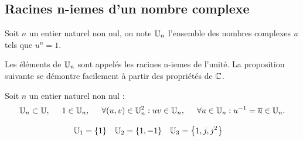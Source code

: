 \subsection{Racines n-iemes d'un nombre complexe}

\begin{defi}
 Soit $n$ un entier naturel non nul, on note $\mathbb{U}_n$ l'ensemble des nombres complexes $u$ tels que $u^n=1$.
\end{defi}
Les éléments de $\mathbb{U}_n$ sont appelés les racines n-iemes de l'unité. La proposition suivante se démontre facilement à partir des propriétés de $\mathbb{C}$.
\begin{prop} Soit $n$ un entier naturel non nul :
 \begin{displaymath}
 \mathbb{U}_n \subset \mathbb{U}, \hspace{0.5cm}
1 \in \mathbb{U}_n , \hspace{0.5cm}
\forall (u,v)\in \mathbb{U}_n^2 : uv\in \mathbb{U}_n , \hspace{0.5cm}
\forall u\in\mathbb{U}_n : u^{-1}=\overline{u}\in \mathbb{U}_n.
\end{displaymath}
\end{prop}
\begin{exples}
 \begin{align*}
  \mathbb{U}_1 = \left\lbrace 1\right\rbrace & & \mathbb{U}_2 = \left\lbrace 1, -1 \right\rbrace & & 
\mathbb{U}_3 = \left\lbrace 1, j, j^2\right\rbrace & &  
 \end{align*}
\end{exples}

